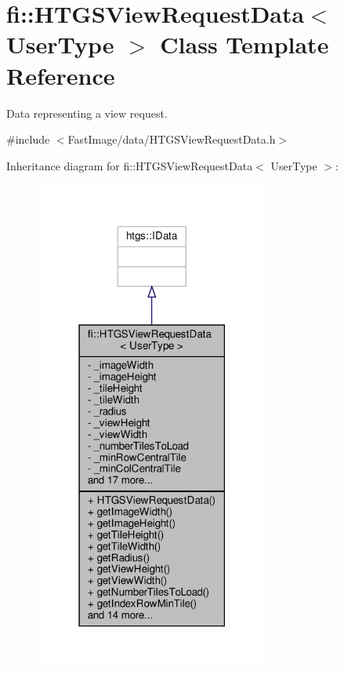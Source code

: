 \hypertarget{classfi_1_1HTGSViewRequestData}{}\section{fi\+:\+:H\+T\+G\+S\+View\+Request\+Data$<$ User\+Type $>$ Class Template Reference}
\label{classfi_1_1HTGSViewRequestData}


Data representing a view request.  




{\ttfamily \#include $<$Fast\+Image/data/\+H\+T\+G\+S\+View\+Request\+Data.\+h$>$}



Inheritance diagram for fi\+:\+:H\+T\+G\+S\+View\+Request\+Data$<$ User\+Type $>$\+:
\nopagebreak
\begin{figure}[H]
\begin{center}
\leavevmode
\includegraphics[width=219pt]{d7/db3/classfi_1_1HTGSViewRequestData__inherit__graph}
\end{center}
\end{figure}


